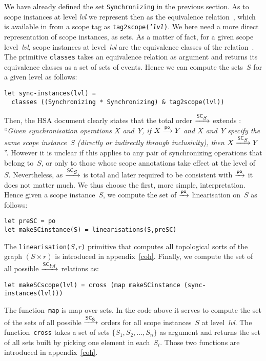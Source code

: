 \documentclass[a4paper]{article}
\begin{document}
We have already defined the set \texttt{Synchronizing} in the previous section.
As to scope instances at level \textit{lvl} we represent then as the
equivalence relation~, which is available
in \cat{} from a scope tag as \texttt{tag2scope('\textit{lvl})}.
We here need a more direct representation of scope instances, as sets.
As a matter of fact,
for a given scope level~\textit{lvl}, scope instances at level~\textit{lvl}
are the equivalence classes of the relation~.
The \cat{} primitive \texttt{classes} takes an equivalence relation as argument
and returns its equivalence classes as a set of sets of events.
Hence we can compute the sets~$S$ for a given level as follows:
\begin{verbatim}
let sync-instances(lvl) =
  classes ((Synchronizing * Synchronizing) & tag2scope(lvl))
\end{verbatim}

Then, the HSA  document clearly states that the total order $\xrightarrow{\textsf{\scriptsize{}SC$_{\textsf{\scriptsize{}$S$}}$}}$
extends \po{}: ``\emph{Given synchronisation operations $X$ and~$Y$, if $X \xrightarrow{\textsf{\scriptsize{}po}} Y$ and $X$ and~$Y$ specify the same scope instance~$S$ (directly or indirectly
through inclusivity), then $X \xrightarrow{\textsf{\scriptsize{}SC$_{\textsf{\scriptsize{}$S$}}$}} Y$}''.
However it is unclear if this applies to any pair of synchronizing operations
that belong to~$S$, or only to those whose scope annotations take effect
at the level of~$S$.
Nevertheless, as $\xrightarrow{\textsf{\scriptsize{}SC$_{\textsf{\scriptsize{}$S$}}$}}$ is total and later required to be consistent
with $\xrightarrow{\textsf{\scriptsize{}po}}$ it does not matter much. We thus choose the first, more simple,
interpretation. Hence given a scope instance~$S$, we compute the set
of $\xrightarrow{\textsf{\scriptsize{}po}}$ linearisation on~$S$ as follows:
\begin{verbatim}
let preSC = po
let makeSCinstance(S) = linearisations(S,preSC)
\end{verbatim}
The \texttt{linearisation($S$,$r$)} primitive that computes all topological sorts of the graph $(S \times r)$ is introduced in appendix~\ref{coh}.
Finally, we compute the set of all possible $\xrightarrow{\textsf{\scriptsize{}SC$_{\textsf{\scriptsize{}{\it\scriptsize{}lvl}}}$}}$ relations as:
\begin{verbatim}
let makeSCscope(lvl) = cross (map makeSCinstance (sync-instances(lvl)))
\end{verbatim}
The function~\texttt{map} is map over sets. In the code above it serves
to compute the set of the sets of all possible $\xrightarrow{\textsf{\scriptsize{}SC$_{\textsf{\scriptsize{}{\ensuremath{}S}}}$}}$ orders
for all scope instances~$S$ at level~\textit{lvl}.
The function~\texttt{cross} takes a set of sets $\{S_1,S_2,\ldots,S_n\}$ as argument and returns the set of all sets built by picking one element
in each~$S_i$. Those two functions are introduced in appendix~\ref{coh}.
\end{document}
